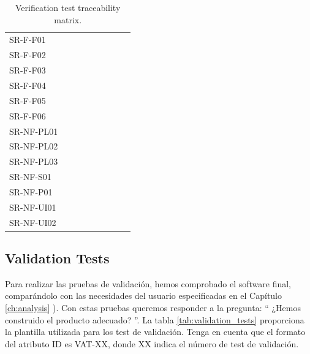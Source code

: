 \begin{table}[htb]
  \centering
  \begin{tabular}{@{}L{3cm}C{0.7cm}C{0.7cm}C{0.7cm}C{0.7cm}C{0.7cm}C{0.7cm}C{0.7cm}C{0.7cm}@{}}
    \toprule
      &  &  &  &  &  &  &  & \\
    \midrule
    SR-F-F01 & & & & & &  & &\\
    SR-F-F02 & & &  & & & & &\\
    SR-F-F03 & & & & & &  & &\\
    SR-F-F04 & & & &  & & & &\\
    SR-F-F05 & & & & &  & & &\\
    SR-F-F06 & &  & & & & & &\\
    SR-NF-PL01 &  & & & & & & & \\
    SR-NF-PL02 &  & & & & & & &\\
    SR-NF-PL03 &  & & & & & & &\\
    SR-NF-S01 & & & & & & &  &\\
    SR-NF-P01 & & & & & & & & \\
    SR-NF-UI01 & &  &  &  &  &  &  & \\
    SR-NF-UI02 &  &  &  &  &  &  &  & \\
    \bottomrule
\end{tabular}
\caption{Verification test traceability matrix.}
\label{tab:verification_matrix}
\end{table}    

\clearpage

\subsection{Validation Tests}


Para realizar las pruebas de validación, hemos comprobado el software final, comparándolo con las necesidades del usuario especificadas en el Capítulo \ref{ch:analysis} \textit{}). Con estas pruebas queremos responder a la pregunta: `` ¿Hemos construido el producto adecuado? ''. La tabla \ref{tab:validation_tests} proporciona la plantilla utilizada para los test de validación. Tenga en cuenta que el formato del atributo ID es VAT-XX, donde XX indica el número de test de validación.



